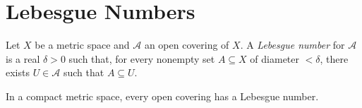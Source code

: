 \section{Lebesgue Numbers}

\begin{df}
  Let $X$ be a metric space and $\mathcal{A}$ an open covering of $X$. A
  \emph{Lebesgue number} for $\mathcal{A}$ is a real $\delta > 0$ such that,
  for every nonempty set $A \subseteq X$ of diameter $< \delta$, there exists
  $U \in \mathcal{A}$ such that $A \subseteq U$.
\end{df}

\begin{lm}
  In a compact metric space, every open covering has a Lebesgue number.
\end{lm}

